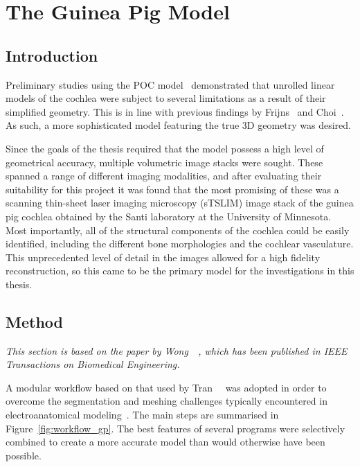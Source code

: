 

\section{The Guinea Pig Model}
\label{sect:gp_model}

\subsection{Introduction}

Preliminary studies using the POC model~\cite{wong2012,inguva2015ner}
demonstrated that unrolled linear models of the cochlea were subject to several
limitations as a result of their simplified geometry. This is in line with
previous findings by Frijns~\cite{frijns1995} and Choi~\cite{choi2005}. As such,
a more sophisticated model featuring the true 3D geometry was desired.

Since the goals of the thesis required that the model possess a high level of
geometrical accuracy, multiple volumetric image stacks were sought. These
spanned a range of different imaging modalities, and after evaluating their
suitability for this project it was found that the most promising of these was a
scanning thin-sheet laser imaging microscopy (sTSLIM) image stack of the guinea
pig cochlea obtained by the Santi laboratory at the University of Minnesota.
Most importantly, all of the structural components of the cochlea could be
easily identified, including the different bone morphologies and the cochlear
vasculature. This unprecedented level of detail in the images allowed for a high
fidelity reconstruction, so this came to be the primary model for the
investigations in this thesis.

\subsection{Method}
\label{sect:method_gp}

\textit{This section is based on the paper by Wong~\etal~\cite{wong2016}, which
has been published in IEEE Transactions on Biomedical Engineering.}

A modular workflow based on that used by Tran~\etal{}~\cite{tran2015} was
adopted in order to overcome the segmentation and meshing challenges typically
encountered in electroanatomical modeling~\cite{briaire2000mesh}. The main steps
are summarised in Figure~\ref{fig:workflow_gp}. The best features of several
programs were selectively combined to create a more accurate model than would
otherwise have been possible.

